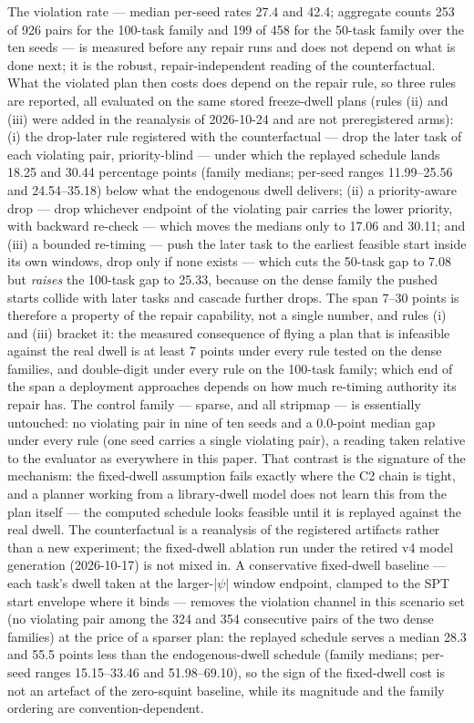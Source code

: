 \documentclass[preprint,authoryear]{elsarticle}
\begin{document}
The violation rate --- median per-seed rates 27.4 and 42.4; aggregate counts 253 of 926 pairs for the 100-task family and 199 of 458 for the 50-task family over the ten seeds --- is measured before any repair runs and does not depend on what is done next; it is the robust, repair-independent reading of the counterfactual. What the violated plan then costs does depend on the repair rule, so three rules are reported, all evaluated on the same stored freeze-dwell plans (rules (ii) and (iii) were added in the reanalysis of 2026-10-24 and are not preregistered arms): (i) the drop-later rule registered with the counterfactual --- drop the later task of each violating pair, priority-blind --- under which the replayed schedule lands 18.25 and 30.44 percentage points (family medians; per-seed ranges 11.99--25.56 and 24.54--35.18) below what the endogenous dwell delivers; (ii) a priority-aware drop --- drop whichever endpoint of the violating pair carries the lower priority, with backward re-check --- which moves the medians only to 17.06 and 30.11; and (iii) a bounded re-timing --- push the later task to the earliest feasible start inside its own windows, drop only if none exists --- which cuts the 50-task gap to 7.08 but \emph{raises} the 100-task gap to 25.33, because on the dense family the pushed starts collide with later tasks and cascade further drops. The span 7--30 points is therefore a property of the repair capability, not a single number, and rules (i) and (iii) bracket it: the measured consequence of flying a plan that is infeasible against the real dwell is at least 7 points under every rule tested on the dense families, and double-digit under every rule on the 100-task family; which end of the span a deployment approaches depends on how much re-timing authority its repair has. The control family --- sparse, and all stripmap --- is essentially untouched: no violating pair in nine of ten seeds and a 0.0-point median gap under every rule (one seed carries a single violating pair), a reading taken relative to the evaluator as everywhere in this paper. That contrast is the signature of the mechanism: the fixed-dwell assumption fails exactly where the C2 chain is tight, and a planner working from a library-dwell model does not learn this from the plan itself --- the computed schedule looks feasible until it is replayed against the real dwell. The counterfactual is a reanalysis of the registered artifacts rather than a new experiment; the fixed-dwell ablation run under the retired v4 model generation (2026-10-17) is not mixed in. A conservative fixed-dwell baseline --- each task's dwell taken at the larger-|$\psi$| window endpoint, clamped to the SPT start envelope where it binds --- removes the violation channel in this scenario set (no violating pair among the 324 and 354 consecutive pairs of the two dense families) at the price of a sparser plan: the replayed schedule serves a median 28.3 and 55.5 points less than the endogenous-dwell schedule (family medians; per-seed ranges 15.15--33.46 and 51.98--69.10), so the sign of the fixed-dwell cost is not an artefact of the zero-squint baseline, while its magnitude and the family ordering are convention-dependent.
\end{document}
